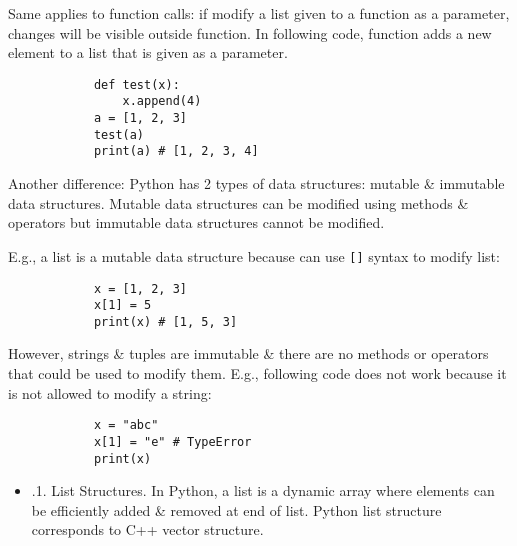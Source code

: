\documentclass{article}
\begin{document}
\begin{itemize}
\begin{itemize}
		Same applies to function calls: if modify a list given to a function as a parameter, changes will be visible outside function. In following code, function adds a new element to a list that is given as a parameter.
		\begin{verbatim}
			def test(x):
			    x.append(4)
			a = [1, 2, 3]
			test(a)
			print(a) # [1, 2, 3, 4]
		\end{verbatim}
		Another difference: Python has 2 types of data structures: mutable \& immutable data structures. Mutable data structures can be modified using methods \& operators but immutable data structures cannot be modified.
		
		E.g., a list is a mutable data structure because can use {\tt[]} syntax to modify list:
		\begin{verbatim}
			x = [1, 2, 3]
			x[1] = 5
			print(x) # [1, 5, 3]
		\end{verbatim}
		However, strings \& tuples are immutable \& there are no methods or operators that could be used to modify them. E.g., following code does not work because it is not allowed to modify a string:
		\begin{verbatim}
			x = "abc"
			x[1] = "e" # TypeError
			print(x)
		\end{verbatim}
		\begin{itemize}
			\item {.1. List Structures.} In Python, a list is a dynamic array where elements can be efficiently added \& removed at end of list. Python list structure corresponds to C++ vector structure.
			

\end{itemize}
\end{itemize}
\end{itemize}
\end{document}

